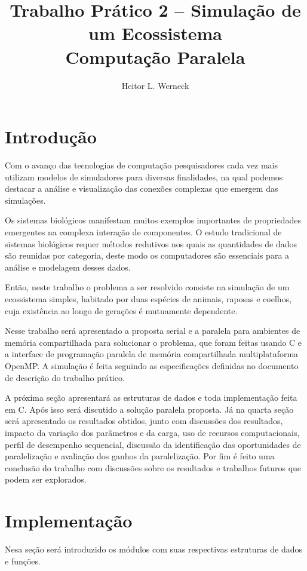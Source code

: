 \documentclass[12pt]{article}
\title{Trabalho Prático 2 -- Simulação de um Ecossistema \\
	\large Computação Paralela}
\author{Heitor L. Werneck}
\begin{document}
\maketitle

\section{Introdução}

Com o avanço das tecnologias de computação pesquisadores cada vez mais utilizam modelos de simuladores para diversas finalidades, na qual podemos destacar a análise e visualização das conexões complexas que emergem das simulações.

Os sistemas biológicos manifestam muitos exemplos importantes de propriedades emergentes na complexa interação de componentes. O estudo tradicional de sistemas biológicos requer métodos redutivos nos quais as quantidades de dados são reunidas por categoria, deste modo os computadores são essenciais para a análise e modelagem desses dados.

Então, neste trabalho o problema a ser resolvido consiste na simulação de um ecossistema simples,
habitado por duas espécies de animais, raposas e coelhos, cuja existência ao longo de gerações é mutuamente dependente.

Nesse trabalho será apresentado a proposta serial e a paralela para ambientes de memória compartilhada para solucionar o problema, que foram feitas usando C e a interface de programação paralela de memória compartilhada multiplataforma OpenMP. A simulação é feita seguindo as especificações definidas no documento de descrição do trabalho prático.

A próxima seção apresentará as estruturas de dados e toda implementação feita em C. Após isso será discutido a solução paralela proposta. Já na quarta seção será apresentado os resultados obtidos, junto com discussões dos resultados, impacto da variação dos parâmetros e da carga, uso de recursos computacionais, perfil de desempenho sequencial, discussão da identificação das oportunidades de paralelização e avaliação dos ganhos da paralelização. Por fim é feito uma conclusão do trabalho com discussões sobre os resultados e trabalhos futuros que podem ser explorados.

\section{Implementação}

Nesa seção será introduzido os módulos com suas respectivas estruturas de dados e funções.
\end{document}
